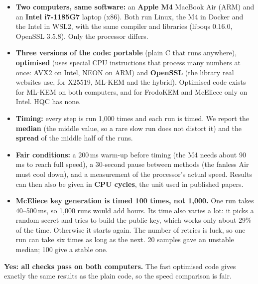 \documentclass[10pt,a4paper]{article}
\newcommand{\key}[1]{\textbf{#1}}
\newcommand{\head}[1]{\par\Needspace{8\baselineskip}\vspace{10pt}{\sffamily\bfseries\large #1}\par\vspace{0pt}}
\begin{document}
\head{3\quad How we measured}
\begin{itemize}
\item \key{Two computers, same software:} an \key{Apple M4} MacBook Air (ARM) and an \key{Intel i7-1185G7} laptop (x86). Both run Linux, the M4 in Docker and the Intel in WSL2, with the same compiler and libraries (liboqs 0.16.0, OpenSSL 3.5.8). Only the processor differs.
\item \key{Three versions of the code:} \key{portable} (plain C that runs anywhere), \key{optimised} (uses special CPU instructions that process many numbers at once: AVX2 on Intel, NEON on ARM) and \key{OpenSSL} (the library real websites use, for X25519, ML-KEM and the hybrid). Optimised code exists for ML-KEM on both computers, and for FrodoKEM and McEliece only on Intel. HQC has none.
\item \key{Timing:} every step is run 1,000 times and each run is timed. We report the \key{median} (the middle value, so a rare slow run does not distort it) and the \key{spread} of the middle half of the runs.
\item \key{Fair conditions:} a 200\,ms warm-up before timing (the M4 needs about 90\,ms to reach full speed), a 30-second pause between methods (the fanless Air must cool down), and a measurement of the processor's actual speed. Results can then also be given in \key{CPU cycles}, the unit used in published papers.
\item \key{McEliece key generation is timed 100 times, not 1,000.} One run takes 40–500\,ms, so 1,000 runs would add hours. Its time also varies a lot: it picks a random secret and tries to build the public key, which works only about 29\% of the time. Otherwise it starts again. The number of retries is luck, so one run can take six times as long as the next. 20 samples gave an unstable median; 100 give a stable one.
\end{itemize}

\head{4\quad E4: is the code correct?}
\key{Yes: all \eFourChecks{} checks pass on both computers.} The fast optimised code gives exactly the same results as the plain code, so the speed comparison is fair.
\begin{table}[H]
\centering\footnotesize

\caption{Correctness checks (E4). ``All 12 KEMs'' = 4 methods × 3 strength levels; ``both versions'' = portable and optimised code. \textbf{Each row is explained in Appendix A.} Not covered: NIST's input-validation tests, which liboqs does not expose.}
\end{table}
\end{document}
